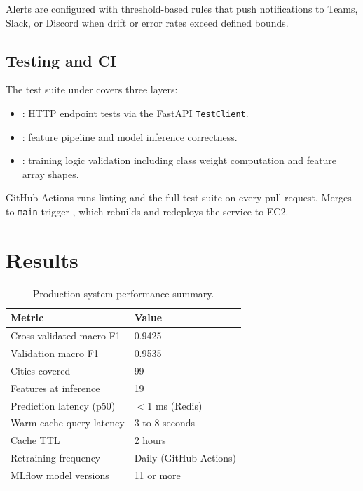 \documentclass[sigconf, nonacm]{acmart}
\begin{document}
Alerts are configured with threshold-based rules that push
notifications to Teams, Slack, or Discord when drift or
error rates exceed defined bounds.

\subsection{Testing and CI}

The test suite under  covers three layers:

\begin{itemize}
  \item {}: HTTP endpoint tests via the
        FastAPI \texttt{TestClient}.
  \item {}: feature pipeline and
        model inference correctness.
  \item {}: training logic
        validation including class weight computation and
        feature array shapes.
\end{itemize}

GitHub Actions  runs linting and the full
test suite on every pull request.  Merges to \texttt{main}
trigger , which rebuilds and redeploys the
service to EC2.

\section{Results}

\begin{table}[h]
  \caption{Production system performance summary.}
  \label{tab:results}
  \small
  \begin{tabular}{@{}p{3.7cm}p{3.5cm}@{}}
    \toprule
    \textbf{Metric} & \textbf{Value} \\
    \midrule
    Cross-validated macro F1    & 0.9425 \\
    Validation macro F1         & 0.9535 \\
    Cities covered              & 99 \\
    Features at inference       & 19 \\
    Prediction latency (p50)    & $<$1 ms (Redis) \\
    Warm-cache query latency    & 3 to 8 seconds \\
    Cache TTL                   & 2 hours \\
    Retraining frequency        & Daily (GitHub Actions) \\
    MLflow model versions       & 11 or more \\
    \bottomrule
  \end{tabular}
\end{table}
\end{document}

